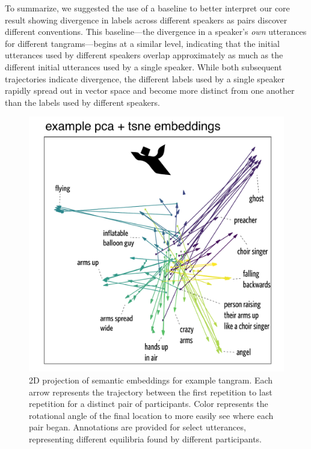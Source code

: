 \documentclass[alpha-refs]{wiley-article}
\begin{document}
To summarize, we suggested the use of a baseline to better interpret our core result showing divergence in labels across different speakers as pairs discover different conventions.
This baseline---the divergence in a speaker's \emph{own} utterances for different tangrams---begins at a similar level, indicating that the initial utterances used by different speakers overlap approximately as much as the different initial utterances used by a single speaker.
While both subsequent trajectories indicate divergence, the different labels used by a single speaker rapidly spread out in vector space and become more distinct from one another than the labels used by different speakers.

\begin{figure}[t!]
\centering
\includegraphics[scale=.6]{tsne-tangramC_annotated.pdf}
\caption{2D projection of semantic embeddings for example tangram. Each arrow represents the trajectory between the first repetition to last repetition for a distinct pair of participants. Color represents the rotational angle of the final location to more easily see where each pair began. Annotations are provided for select utterances, representing different equilibria found by different participants.}
\label{fig:tsne}
\end{figure}
\end{document}
